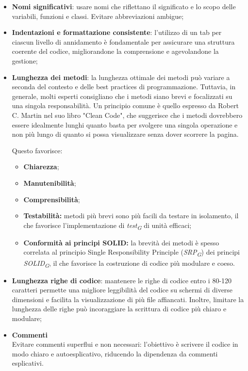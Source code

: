 \begin{itemize}
    \item \textbf{Nomi significativi}: usare nomi che riflettano il significato e lo scopo delle variabili, funzioni e classi. Evitare abbreviazioni ambigue;
    \item \textbf{Indentazioni e formattazione consistente}: l'utilizzo di un tab per ciascun livello di annidamento è fondamentale per assicurare una struttura coerente del codice, migliorandone la comprensione e agevolandone la gestione;
    \item \textbf{Lunghezza dei metodi}: la lunghezza ottimale dei metodi può variare a seconda del contesto e delle best practices di programmazione. Tuttavia, in generale, molti esperti consigliano che i metodi siano brevi e focalizzati su una singola responsabilità. Un principio comune è quello espresso da Robert C. Martin nel suo libro "Clean Code", che suggerisce che i metodi dovrebbero essere idealmente lunghi quanto basta per svolgere una singola operazione e non più lungo di quanto si possa visualizzare senza dover scorrere la pagina. 
    
    Questo favorisce:
    \begin{itemize}
        \item \textbf{Chiarezza};
        \item \textbf{Manutenibilità};
        \item \textbf{Comprensibilità};
        \item \textbf{Testabilità:} metodi più brevi sono più facili da testare in isolamento, il che favorisce l'implementazione di \textit{test}\textsubscript{\textit{G}} di unità efficaci;
        \item \textbf{Conformità ai principi SOLID:} la brevità dei metodi è spesso correlata al principio Single Responsibility Principle (\textit{SRP}\textsubscript{\textit{G}}) dei principi \textit{SOLID}\textsubscript{\textit{G}}, il che favorisce la costruzione di codice più modulare e coeso.
    \end{itemize} 
    \item \textbf{Lunghezza righe di codice}: mantenere le righe di codice entro i 80-120 caratteri permette una migliore leggibilità del codice su schermi di diverse dimensioni e facilita la visualizzazione di più file affiancati. Inoltre, limitare la lunghezza delle righe può incoraggiare la scrittura di codice più chiaro e modulare;
    \item \textbf{Commenti} \\
    Evitare commenti superflui e non necessari: l'obiettivo è scrivere il codice in modo chiaro e autoesplicativo, riducendo la dipendenza da commenti esplicativi.
\end{itemize}

